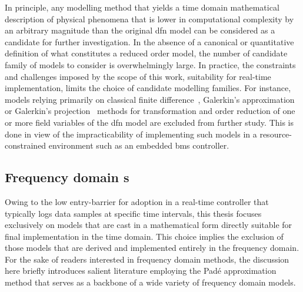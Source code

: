 In  principle, any  modelling  method  that yields  a  time domain  mathematical
description of physical  phenomena that is lower in  computational complexity by
an arbitrary  magnitude than the original  \gls{dfn} model can be  considered as
a  candidate  for further  investigation.  In  the  absence  of a  canonical  or
quantitative definition of what constitutes a reduced order model, the number of
candidate family  of models  to consider is  overwhelmingly large.  In practice,
the  constraints and  challenges  imposed  by the  scope  of  this work,  \viz{}
suitability  for  real-time  implementation,  limits  the  choice  of  candidate
modelling  families.  For  instance,   models  relying  primarily  on  classical
finite  difference~\cite{Smith2006}, Galerkin's  approximation~\cite{Dao2012} or
Galerkin's  projection~\cite{Fan2016,Fan2018}  methods  for  transformation  and
order  reduction of  one or  more  field variables  of the  \gls{dfn} model  are
excluded from  further study. This  is done in  view of the  impracticability of
implementing  such  models in  a  resource-constrained  environment such  as  an
embedded \gls{bms} controller.

\subsection{Frequency   domain   s}\label{subsec:freqdomainroms}

Owing  to the  low entry-barrier  for adoption  in a  real-time controller  that
typically  logs data  samples at  specific time  intervals, this  thesis focuses
exclusively on models that are cast in a mathematical form directly suitable for
final implementation  in the time domain.  This choice implies the  exclusion of
those models that are derived and  implemented entirely in the frequency domain.
For the sake  of readers interested in frequency domain  methods, the discussion
here  briefly introduces  salient literature  employing the  Padé approximation
method that serves as a backbone of a wide variety of frequency domain models.


